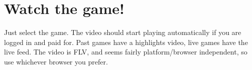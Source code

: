 \documentclass[12pt]{article}
\begin{document}
\section{Watch the game!}
	Just select the game. The video should start playing automatically if you are logged in and paid
	for. Past games have a highlights video, live games have the live feed. The video is FLV, and
	seems fairly platform/browser independent, so use whichever browser you prefer.
		
\end{document}

